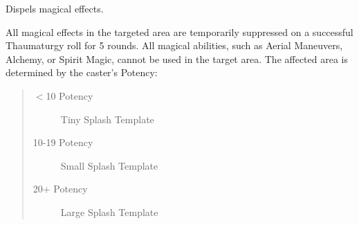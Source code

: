 \documentclass[11pt,a4paper,twocolumn]{book}
\begin{document}
\medskip

Dispels magical effects.

All magical effects in the targeted area are temporarily suppressed on a successful Thaumaturgy roll for 5 rounds. All magical abilities, such as Aerial Maneuvers, Alchemy, or Spirit Magic, cannot be used in the target area. The affected area is determined by the caster's Potency:

\begin{quote}
	\begin{description}
		\item[$<$10 Potency] 	Tiny Splash Template
		\item[10-19 Potency] 	Small Splash Template
		\item[20+ Potency] 	Large Splash Template
	\end{description}
\end{quote}

\vfill

%	

%
\end{document}
